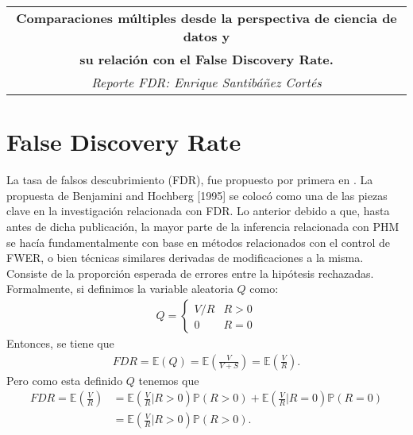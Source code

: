 \documentclass[11pt,letterpaper]{article}
\newcommand{\mP}{\mathbb{P}}
\newcommand{\mE}{\mathbb{E}}
\begin{document}
\begin{table}[ht]
\centering
\begin{tabular}{c}
\textbf{Comparaciones múltiples desde la perspectiva de ciencia de datos y}\\
\textbf{su relación con el False Discovery Rate.}\\
\textit{Reporte FDR: Enrique Santibáñez Cortés}
\end{tabular}
\end{table}
\section*{False Discovery Rate}
La tasa de falsos descubrimiento (FDR), fue propuesto por primera en . La propuesta de Benjamini and Hochberg [1995] se colocó como una de las piezas clave en la investigación relacionada con FDR. Lo anterior debido a que, hasta antes de dicha publicación, la mayor parte de la inferencia relacionada con PHM se hacía fundamentalmente con base en métodos relacionados con el control de FWER, o bien técnicas similares derivadas de modificaciones a la misma. Consiste de la proporción esperada de errores entre la hipótesis rechazadas. Formalmente, si definimos la variable aleatoria $Q$ como:
\begin{align} \label{e_fdr}
Q=\left\{ \begin{array}{cc}
V/R & R>0\\
0 & R=0
\end{array} \right.
\end{align}
Entonces, se tiene que 
\begin{align*}
FDR = \mE(Q)=\mE\left( \frac{V}{V+S}\right)=\mE\left( \frac{V}{R} \right).
\end{align*}
Pero como esta definido $Q$ tenemos que 
\begin{align}\label{igudaldad_Q}
FDR=\mE\left( \frac{V}{R} \right) &= \mE\left( \frac{V}{R}\left| R>0\right. \right)\mP(R>0)+\mE\left( \frac{V}{R}\left| R=0\right. \right)\mP(R=0)\\
&= \mE\left( \frac{V}{R}\left| R>0\right. \right)\mP(R>0).
\end{align}
\end{document}
